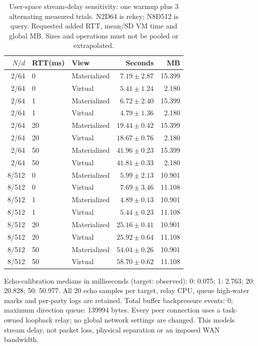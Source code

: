 \begin{table}[t]
\caption{User-space stream-delay sensitivity: one warmup plus 3 alternating measured trials. N2D64 is rekey; N8D512 is query. Requested added RTT, mean/SD VM time and global MB. Sizes and operations must not be pooled or extrapolated.}
\label{tab:v3network}\centering\small
\setlength{\tabcolsep}{3pt}
\begin{tabular}{rllrr}
\toprule
$N/d$ & RTT(ms) & View & Seconds & MB \\
\midrule
2/64 & 0 & Materialized & $7.19\pm2.87$ & 15.399 \\
2/64 & 0 & Virtual & $5.41\pm1.24$ & 2.180 \\
2/64 & 1 & Materialized & $6.72\pm2.40$ & 15.399 \\
2/64 & 1 & Virtual & $4.79\pm1.36$ & 2.180 \\
2/64 & 20 & Materialized & $19.44\pm0.42$ & 15.399 \\
2/64 & 20 & Virtual & $18.67\pm0.76$ & 2.180 \\
2/64 & 50 & Materialized & $41.96\pm0.23$ & 15.399 \\
2/64 & 50 & Virtual & $41.81\pm0.33$ & 2.180 \\
8/512 & 0 & Materialized & $5.99\pm2.13$ & 10.901 \\
8/512 & 0 & Virtual & $7.69\pm3.46$ & 11.108 \\
8/512 & 1 & Materialized & $4.89\pm0.13$ & 10.901 \\
8/512 & 1 & Virtual & $5.44\pm0.23$ & 11.108 \\
8/512 & 20 & Materialized & $25.16\pm0.41$ & 10.901 \\
8/512 & 20 & Virtual & $25.92\pm0.64$ & 11.108 \\
8/512 & 50 & Materialized & $54.04\pm0.26$ & 10.901 \\
8/512 & 50 & Virtual & $58.70\pm0.62$ & 11.108 \\
\bottomrule
\end{tabular}
\end{table}

Echo-calibration medians in milliseconds (target: observed): 0: 0.075; 1: 2.763; 20: 20.828; 50: 50.977. All 20 echo samples per target, relay CPU, queue high-water marks and per-party logs are retained. Total buffer backpressure events: 0; maximum direction queue: 139994 bytes. Every peer connection uses a task-owned loopback relay; no global network settings are changed. This models stream delay, not packet loss, physical separation or an imposed WAN bandwidth.
